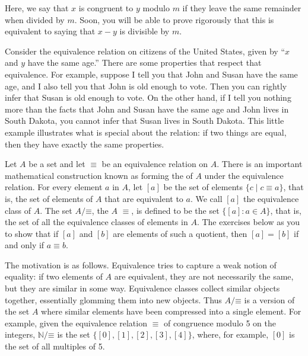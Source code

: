 \documentclass[letterpaper,10pt,english]{sphinxmanual}
\begin{document}
\sphinxAtStartPar
Here, we say that \(x\) is congruent to \(y\) modulo \(m\) if they leave the same remainder when divided by \(m\). Soon, you will be able to prove rigorously that this is equivalent to saying that \(x - y\) is divisible by \(m\).

\sphinxAtStartPar
Consider the equivalence relation on citizens of the United States, given by “\(x\) and \(y\) have the same age.” There are some properties that respect that equivalence. For example, suppose I tell you that John and Susan have the same age, and I also tell you that John is old enough to vote. Then you can rightly infer that Susan is old enough to vote. On the other hand, if I tell you nothing more than the facts that John and Susan have the same age and John lives in South Dakota, you cannot infer that Susan lives in South Dakota. This little example illustrates what is special about the  relation: if two things are equal, then they have exactly the same properties.

\sphinxAtStartPar
Let \(A\) be a set and let \(\equiv\) be an equivalence relation on \(A\). There is an important mathematical construction known as forming the  of \(A\) under the equivalence relation. For every element \(a\) in \(A\), let \([a]\) be the set of elements \(\{ c \mid c \equiv a \}\), that is, the set of elements of \(A\) that are equivalent to \(a\). We call \([a]\) the equivalence class of \(A\). The set \(A / \mathord{\equiv}\), the  \(A\)  \(\equiv\), is defined to be the set \(\{ [a] : a \in A \}\), that is, the set of all the equivalence classes of elements in \(A\). The exercises below as you to show that if \([a]\) and \([b]\) are elements of such a quotient, then \([a] = [b]\) if and only if \(a \equiv b\).

\sphinxAtStartPar
The motivation is as follows. Equivalence tries to capture a weak notion of equality: if two elements of \(A\) are equivalent, they are not necessarily the same, but they are similar in some way. Equivalence classes collect similar objects together, essentially glomming them into new objects.  Thus \(A / \mathord{\equiv}\) is a version of the set \(A\) where similar elements have been compressed into a single element. For example, given the equivalence relation \(\equiv\) of congruence modulo 5 on the integers, \(\mathbb{N} / \mathord{\equiv}\) is the set \(\{ [0], [1], [2], [3], [4] \}\), where, for example, \([0]\) is the set of all multiples of 5.
\end{document}
